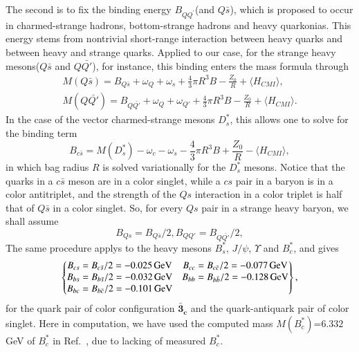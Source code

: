 \documentclass[prt,twocolumn,floatfix,nofootinbib]{revtex4}
\begin{document}
The second is to fix the binding energy $B_{QQ^{\prime}}$(and $Q\bar{s}$), which is proposed \cite{Karliner:2014gca} to occur in charmed-strange hadrons, bottom-strange hadrons and heavy quarkonias. This energy stems from nontrivial short-range interaction between heavy quarks and between heavy and strange quarks\cite{Karliner:2014gca,Karliner:2017elp,Karliner:2018bms}. Applied to our case, for the strange heavy mesons($Q\bar{s}$ and $Q\bar{Q\prime}$), for instance, this binding enters the mass formula through
\begin{equation}\label{HLm0}
    \begin{aligned}
    M(Q\bar{s})=B_{Q\bar{s}}+\omega_{Q}+\omega_{s}+\frac{4}{3}\pi R^{3}B-\frac{Z_{0}}{R}+ \langle H_{CMI} \rangle, \\
    M(Q\bar{Q\prime})=B_{Q\bar{Q\prime}}+\omega_{Q}+\omega_{Q\prime}+\frac{4}{3}\pi R^{3}B-\frac{Z_{0}}{R}+ \langle H_{CMI} \rangle.
    \end{aligned}
\end{equation}
In the case of the vector charmed-strange mesons $D_{s}^{\ast}$, this allows one to solve for the binding term
\begin{equation}\label{BB0}
    B_{c\bar{s}}=M(D_{s}^{\ast})-\omega_{c}-\omega_{s}-\frac{4}{3}\pi R^{3}B+\frac{Z_{0}}{R}-\langle H_{CMI} \rangle,
\end{equation}
in which bag radius $R$ is solved variationally for the $D_{s}^{\ast}$ mesons. Notice that the quarks in a $c\bar{s}$ meson are in a color singlet, while a $cs$ pair in a baryon is in a color antitriplet, and the strength of the $Qs$ interaction in a color triplet is half that of $Q\bar{s}$ in a color singlet. So, for every $Qs$ pair in a strange heavy baryon, we shall assume
\begin{equation}\label{half}
    B_{Qs}=B_{Q\bar{s}}/2,B_{QQ\prime}=B_{Q\bar{Q\prime}}/2,
\end{equation}
The same procedure applys to the heavy mesons $B_{s}^{\ast}$, $J/\psi$, $\Upsilon$ and $B_{c}^{\ast}$, and gives
\begin{equation}\label{bingdings}
    \begin{Bmatrix}
        B_{cs}=B_{c\bar{s}}/2=-0.025\,{\rm GeV} & B_{cc}=B_{c\bar{c}}/2=-0.077\,{\rm GeV} \\
        B_{bs}=B_{b\bar{s}}/2=-0.032\,{\rm GeV} & B_{bb}=B_{b\bar{b}}/2=-0.128\,{\rm GeV} \\
        B_{bc}=B_{b\bar{c}}/2=-0.101\,{\rm GeV}
    \end{Bmatrix},
\end{equation}
for the quark pair of color configuration $\boldsymbol{\bar{3}_{c}}$ and the quark-antiquark pair of color singlet. Here in computation, we have used the computed mass $M(B_{c}^{\ast})$=$6.332$ GeV of $B_{c}^{\ast}$ in Ref.~\cite{Ebert:2002pp}, due to lacking of measured $B_{c}^{\ast}$.
\end{document}
